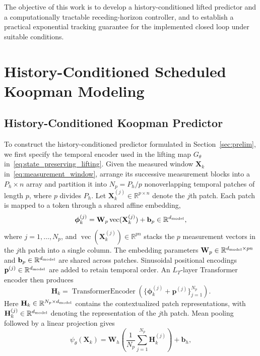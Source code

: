 \documentclass[journal]{IEEEtran}
\theoremstyle{plain}
\theoremstyle{definition}
\newcommand{\vphi}{\boldsymbol{\phi}}
\newcommand{\vp}{\mathbf{p}}
\newcommand{\vb}{\mathbf{b}}
\newcommand{\mH}{\mathbf{H}}
\newcommand{\mW}{\mathbf{W}}
\newcommand{\mX}{\mathbf{X}}
\newcommand{\R}{\mathbb{R}}
\begin{document}
The objective of this work is to develop a history-conditioned lifted predictor and a computationally tractable receding-horizon controller, and to establish a practical exponential tracking guarantee for the implemented closed loop under suitable conditions.

\section{History-Conditioned Scheduled Koopman Modeling}
\label{sec:model}
\subsection{History-Conditioned Koopman Predictor}
\label{sec:temporal_lifting}
To construct the history-conditioned predictor formulated in Section~\ref{sec:prelim}, we first specify the temporal encoder used in the lifting map $G_\theta$ in~\eqref{eq:state_preserving_lifting}. Given the measured window $\mX_k$ in~\eqref{eq:measurement_window}, arrange its successive measurement blocks into a $P_h\times n$ array and partition it into $N_p=P_h/p$ nonoverlapping temporal patches of length $p$, where $p$ divides $P_h$. Let $\mX_k^{(j)}\in\R^{p\times n}$ denote the $j$th patch. Each patch is mapped to a token through a shared affine embedding,
\begin{equation}
\vphi_k^{(j)}=\mW_p\operatorname{vec}(\mX_k^{(j)})+\vb_p\in\R^{d_{\rm model}},
\label{eq:patch_embedding}
\end{equation}
where $j=1,\ldots,N_p$, and $\operatorname{vec}(\mX_k^{(j)})\in\R^{pn}$ stacks the $p$ measurement vectors in the $j$th patch into a single column. The embedding parameters $\mW_p\in\R^{d_{\rm model}\times pn}$ and $\vb_p\in\R^{d_{\rm model}}$ are shared across patches. Sinusoidal positional encodings $\vp^{(j)}\in\R^{d_{\rm model}}$ \cite{vaswani2017attention} are added to retain temporal order. An $L_T$-layer Transformer encoder then produces
\begin{equation}
\mH_k=\operatorname{TransformerEncoder}\left(\{\vphi_k^{(j)}+\vp^{(j)}\}_{j=1}^{N_p}\right).
\label{eq:transformer_encoder}
\end{equation}
Here $\mH_k\in\R^{N_p\times d_{\rm model}}$ contains the contextualized patch representations, with $\mH_k^{(j)}\in\R^{d_{\rm model}}$ denoting the representation of the $j$th patch. Mean pooling followed by a linear projection gives
\begin{equation}
\psi_\theta(\mX_k)=\mW_h\left(\frac1{N_p}\sum_{j=1}^{N_p}\mH_k^{(j)}\right)+\vb_h,
\label{eq:history_features}
\end{equation}
\end{document}
